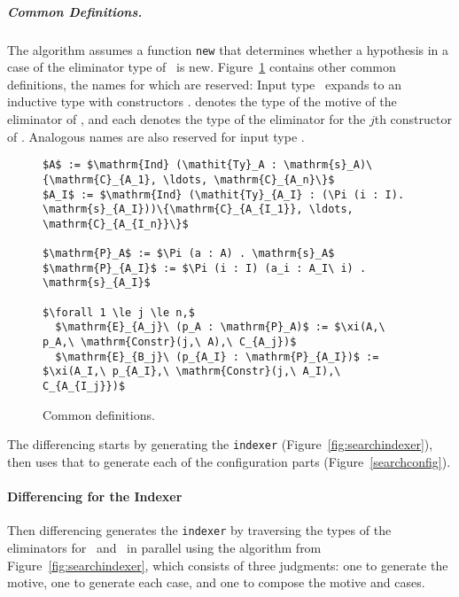 
\subparagraph*{Common Definitions.}
The algorithm assumes a function \lstinline{new} that determines whether a hypothesis in a case of the eliminator type of \AI\ is new.
Figure~\ref{fig:common} contains other common definitions, the names for which are reserved:
Input type \Aa\ expands to an inductive type with constructors
.
 denotes the type of the motive of the eliminator of \Aa,
and each  denotes the type of the eliminator for the $j$th constructor of \Aa.
Analogous names are also reserved for input type \AI.

\begin{figure}
\begin{lstlisting}
$A$ := $\mathrm{Ind} (\mathit{Ty}_A : \mathrm{s}_A)\{\mathrm{C}_{A_1}, \ldots, \mathrm{C}_{A_n}\}$
$A_I$ := $\mathrm{Ind} (\mathit{Ty}_{A_I} : (\Pi (i : I). \mathrm{s}_{A_I}))\{\mathrm{C}_{A_{I_1}}, \ldots, \mathrm{C}_{A_{I_n}}\}$

$\mathrm{P}_A$ := $\Pi (a : A) . \mathrm{s}_A$
$\mathrm{P}_{A_I}$ := $\Pi (i : I) (a_i : A_I\ i) . \mathrm{s}_{A_I}$

$\forall 1 \le j \le n,$
  $\mathrm{E}_{A_j}\ (p_A : \mathrm{P}_A)$ := $\xi(A,\ p_A,\ \mathrm{Constr}(j,\ A),\ C_{A_j})$
  $\mathrm{E}_{B_j}\ (p_{A_I} : \mathrm{P}_{A_I})$ := $\xi(A_I,\ p_{A_I},\ \mathrm{Constr}(j,\ A_I),\ C_{A_{I_j}})$
\end{lstlisting}
\vspace{-0.3cm}
\caption{Common definitions.}
\label{fig:common}
\end{figure}

The differencing starts by generating the \lstinline{indexer} (Figure~\ref{fig:searchindexer}),
then uses that to generate each of the configuration parts (Figure~\ref{searchconfig}).

\paragraph{Differencing for the Indexer}
Then differencing generates the \lstinline{indexer} by traversing the types of the eliminators for \Aa\ and \AI\ in parallel using the algorithm from Figure~\ref{fig:searchindexer},
which consists of three judgments: one to generate the motive, one to generate each case,
and one to compose the motive and cases.


